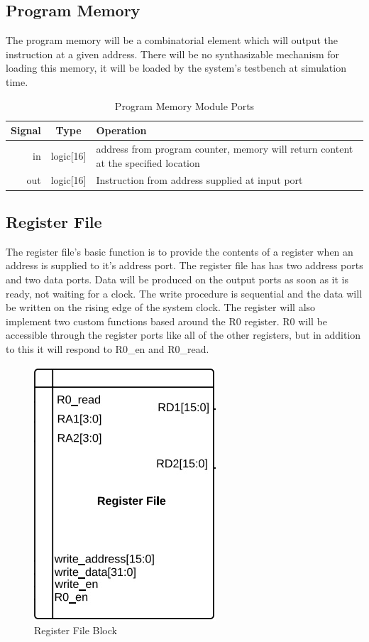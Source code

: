     \subsection{Program Memory}
    The program memory will be a combinatorial element which will output the instruction at a given address. There will be no synthasizable mechanism for loading this memory, it will be loaded by the system's testbench at simulation time.
    \begin{table}[H]
        \caption{Program Memory Module Ports}
        \label{programmemory}
        \centering
        \begin{tabular}{r c p{4.5cm}}
        Signal    &Type       & Operation\\
        \hline
        in & logic[16]& address from program counter, memory will return content at the specified location \\
        out & logic[16]& Instruction from address supplied at input port \\    
        \end{tabular}
    \end{table}

    \subsection{Register File}
    The register file's basic function is to provide the contents of a register when an address is supplied to it's address port. The register file has has two address ports and two data ports. Data will be produced on the output ports as soon as it is ready, not waiting for a clock. The write procedure is sequential and the data will be written on the rising edge of the system clock. The register will also implement two custom functions based around the R0 register. R0 will be accessible through the register ports like all of the other registers, but in addition to this it will respond to R0\_en and R0\_read.
    \begin{figure}[H]
        \centering
        \includegraphics[width=.28\textwidth]{./figures/rf.jpg}
        \caption{Register File Block}
        \label{rffig}
    \end{figure}

